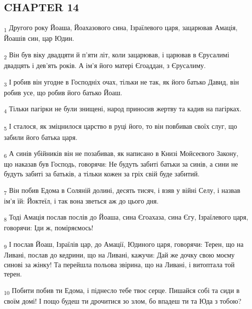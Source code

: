 \subsection{CHAPTER 14}
\begin{tcolorbox}
\textsubscript{1} Другого року Йоаша, Йоахазового сина, Ізраїлевого царя, зацарював Амація, Йоашів син, цар Юдин.
\end{tcolorbox}
\begin{tcolorbox}
\textsubscript{2} Він був віку двадцяти й п'яти літ, коли зацарював, і царював в Єрусалимі двадцять і дев'ять років. А ім'я його матері Єгоаддан, з Єрусалиму.
\end{tcolorbox}
\begin{tcolorbox}
\textsubscript{3} І робив він угодне в Господніх очах, тільки не так, як його батько Давид, він робив усе, що робив його батько Йоаш.
\end{tcolorbox}
\begin{tcolorbox}
\textsubscript{4} Тільки пагірки не були знищені, народ приносив жертву та кадив на пагірках.
\end{tcolorbox}
\begin{tcolorbox}
\textsubscript{5} І сталося, як зміцнилося царство в руці його, то він повбивав своїх слуг, що забили його батька царя.
\end{tcolorbox}
\begin{tcolorbox}
\textsubscript{6} А синів убійників він не позабивав, як написано в Книзі Мойсеєвого Закону, що наказав був Господь, говорячи: Не будуть забиті батьки за синів, а сини не будуть забиті за батьків, а тільки кожен за гріх свій буде забитий.
\end{tcolorbox}
\begin{tcolorbox}
\textsubscript{7} Він побив Едома в Соляній долині, десять тисяч, і взяв у війні Селу, і назвав ім'я їй: Йоктеїл, і так вона зветься аж до цього дня.
\end{tcolorbox}
\begin{tcolorbox}
\textsubscript{8} Тоді Амація послав послів до Йоаша, сина Єгоахаза, сина Єгу, Ізраїлевого царя, говорячи: Іди ж, поміряємось!
\end{tcolorbox}
\begin{tcolorbox}
\textsubscript{9} І послав Йоаш, Ізраїлів цар, до Амації, Юдиного царя, говорячи: Терен, що на Ливані, послав до кедрини, що на Ливані, кажучи: Дай же дочку свою моєму синові за жінку! Та перейшла польова звірина, що на Ливані, і витоптала той терен.
\end{tcolorbox}
\begin{tcolorbox}
\textsubscript{10} Побити побив ти Едома, і піднесло тебе твоє серце. Пишайся собі та сиди в своїм домі! І пощо будеш ти дрочитися зо злом, бо впадеш ти та Юда з тобою?
\end{tcolorbox}
